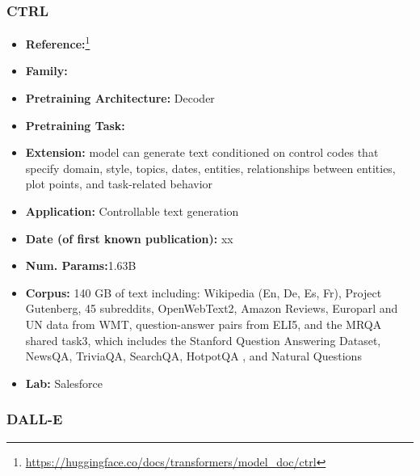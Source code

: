 \documentclass{article}
\begin{document}
\subsubsection{CTRL}

            \begin{itemize}
                \item \textbf{Reference:}\footnote{\url{https://huggingface.co/docs/transformers/model_doc/ctrl}}\cite{keskar2019ctrl}
                \item \textbf{Family:} 
                \item \textbf{Pretraining Architecture:} Decoder
                \item \textbf{Pretraining Task:}
                \item \textbf{Extension:} model can generate text conditioned on control codes that specify domain, style, topics, dates, entities, relationships between entities, plot points, and task-related behavior  
                \item \textbf{Application:} Controllable text generation
                \item \textbf{Date (of first known publication):} xx
                \item \textbf{Num. Params:}1.63B
                \item \textbf{Corpus:} 140 GB of text including: Wikipedia (En, De, Es, Fr), Project Gutenberg, 45 subreddits, OpenWebText2, Amazon Reviews, Europarl and UN data from WMT, question-answer pairs from ELI5, and the MRQA shared task3, which includes the Stanford Question Answering Dataset, NewsQA, TriviaQA, SearchQA, HotpotQA , and Natural Questions
                \item \textbf{Lab:} Salesforce
            \end{itemize}
            
\subsubsection{DALL-E}
\end{document}
